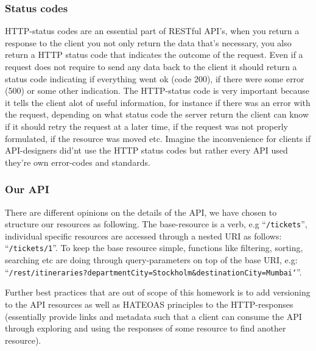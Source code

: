 \documentclass[a4paper, 11pt]{article}
\begin{document}
\subsubsection*{Status codes}
HTTP-status codes are an essential part of RESTful API's, when you return a response to the client you not only return the data that's necessary, you also return a HTTP status code that indicates the outcome of the request. Even if a request does not require to send any data back to the client it should return a status code indicating if everything went ok (code 200), if there were some error (500) or some other indication. The HTTP-status code is very important because it tells the client alot of useful information, for instance if there was an error with the request, depending on what status code the server return the client can know if it should retry the request at a later time, if the request was not properly formulated, if the resource was moved etc. Imagine the inconvenience for clients if API-designers did'nt use the HTTP status codes but rather every API used they're own error-codes and standards.

\subsubsection*{Our API}
There are different opinions on the details of the API, we have chosen to structure our resources as following. The base-resource is a verb, e.g ``\texttt{/tickets}'', individual specific resources are accessed through a nested URI as follows: ``\texttt{/tickets/1}''. To keep the base resource simple, functions like filtering, sorting, searching etc are doing through query-parameters on top of the base URI, e.g: ``\texttt{/rest/itineraries?departmentCity=Stockholm\&destinationCity=Mumbai`}''.

Further best practices that are out of scope of this homework is to add versioning to the API resources as well as HATEOAS principles to the HTTP-responses (essentially provide links and metadata such that a client can consume the API through exploring and using the responses of some resource to find another resource).
\end{document}
